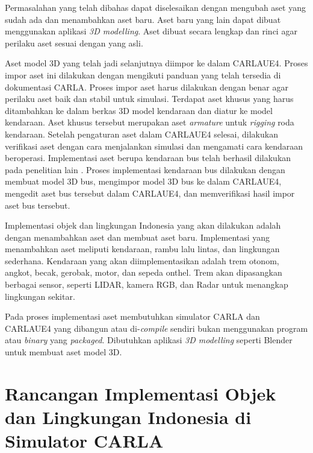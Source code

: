 Permasalahan yang telah dibahas dapat diselesaikan dengan mengubah aset yang
sudah ada dan menambahkan aset baru. Aset baru yang lain dapat dibuat
menggunakan aplikasi \textit{3D modelling}. Aset dibuat secara lengkap dan rinci
agar perilaku aset sesuai dengan yang asli.


Aset model 3D yang telah jadi selanjutnya diimpor ke dalam CARLAUE4.
Proses impor aset ini dilakukan dengan mengikuti panduan yang telah tersedia di
dokumentasi CARLA. Proses impor aset harus dilakukan dengan benar agar perilaku
aset baik dan stabil untuk simulasi. Terdapat aset khusus yang harus ditambahkan
ke dalam berkas 3D model kendaraan dan diatur ke model kendaraan. Aset khusus
tersebut merupakan aset \textit{armature} untuk \textit{rigging} roda kendaraan.
Setelah pengaturan aset dalam CARLAUE4 selesai, dilakukan verifikasi aset dengan
cara menjalankan simulasi dan mengamati cara kendaraan beroperasi. Implementasi
aset berupa kendaraan bus telah berhasil dilakukan pada penelitian lain
\parencite{related-work-xiang}. Proses implementasi kendaraan bus dilakukan
dengan membuat model 3D bus, mengimpor model 3D bus ke dalam CARLAUE4, mengedit
aset bus tersebut dalam CARLAUE4, dan memverifikasi hasil impor aset bus
tersebut.

Implementasi objek dan lingkungan Indonesia yang akan dilakukan adalah dengan
menambahkan aset dan membuat aset baru. Implementasi yang menambahkan aset
meliputi kendaraan, rambu lalu lintas, dan lingkungan sederhana. Kendaraan yang
akan diimplementasikan adalah trem otonom, angkot, becak, gerobak, motor, dan
sepeda onthel. Trem akan dipasangkan berbagai sensor, seperti LIDAR, kamera RGB,
dan Radar untuk menangkap lingkungan sekitar.

Pada proses implementasi aset membutuhkan simulator CARLA dan CARLAUE4 yang
dibangun atau di-\textit{compile} sendiri bukan menggunakan program atau
\textit{binary} yang \textit{packaged}. Dibutuhkan aplikasi \textit{3D
modelling} seperti Blender untuk membuat aset model 3D.

\section{Rancangan Implementasi Objek dan Lingkungan Indonesia di Simulator CARLA}

